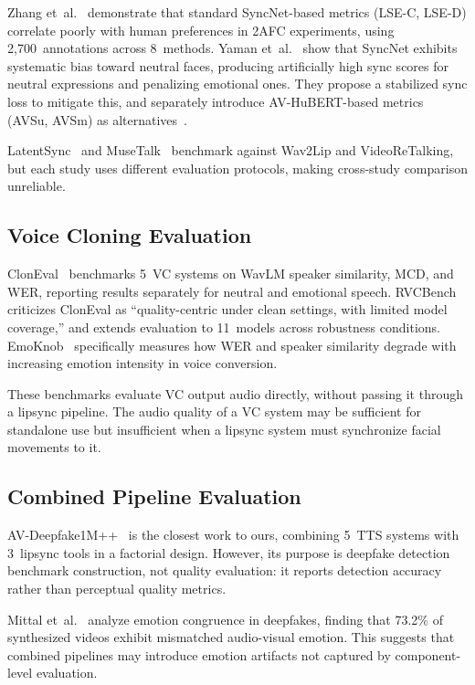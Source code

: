 \documentclass[11pt,a4paper]{article}
\begin{document}
Zhang et~al.~\citep{zhang2024perceptual} demonstrate that standard SyncNet-based metrics (LSE-C, LSE-D) correlate poorly with human preferences in 2AFC experiments, using 2,700~annotations across 8~methods.
Yaman et~al.~\citep{yaman2024stabilized} show that SyncNet exhibits systematic bias toward neutral faces, producing artificially high sync scores for neutral expressions and penalizing emotional ones.
They propose a stabilized sync loss to mitigate this, and separately introduce AV-HuBERT-based metrics (AVSu, AVSm) as alternatives~\citep{yaman2024avhubert}.

LatentSync~\citep{latentsync2024} and MuseTalk~\citep{musetalk2024} benchmark against Wav2Lip and VideoReTalking, but each study uses different evaluation protocols, making cross-study comparison unreliable.

\subsection{Voice Cloning Evaluation}

ClonEval~\citep{christop2025cloneval} benchmarks 5~VC systems on WavLM speaker similarity, MCD, and WER, reporting results separately for neutral and emotional speech.
RVCBench~\citep{rvcbench2026} criticizes ClonEval as ``quality-centric under clean settings, with limited model coverage,'' and extends evaluation to 11~models across robustness conditions.
EmoKnob~\citep{emoknob2024} specifically measures how WER and speaker similarity degrade with increasing emotion intensity in voice conversion.

These benchmarks evaluate VC output audio directly, without passing it through a lipsync pipeline.
The audio quality of a VC system may be sufficient for standalone use but insufficient when a lipsync system must synchronize facial movements to it.

\subsection{Combined Pipeline Evaluation}

AV-Deepfake1M++~\citep{cai2025avdeepfake} is the closest work to ours, combining 5~TTS systems with 3~lipsync tools in a factorial design.
However, its purpose is deepfake detection benchmark construction, not quality evaluation: it reports detection accuracy rather than perceptual quality metrics.

Mittal et~al.~\citep{mittal2020emotions} analyze emotion congruence in deepfakes, finding that 73.2\% of synthesized videos exhibit mismatched audio-visual emotion.
This suggests that combined pipelines may introduce emotion artifacts not captured by component-level evaluation.
\end{document}
